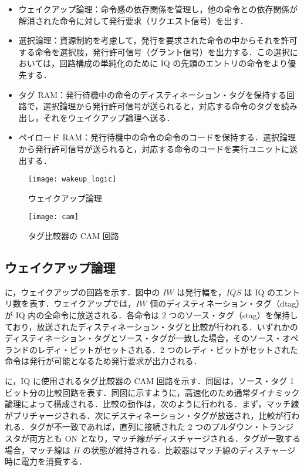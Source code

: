 \begin{itemize}
  \item ウェイクアップ論理：命令感の依存関係を管理し，他の命令との依存関係が解消された命令に対して発行要求（リクエスト信号）を出す．
  \item 選択論理：資源制約を考慮して，発行を要求された命令の中からそれを許可する命令を選択肢，発行許可信号（グラント信号）を出力する．この選択においては，回路構成の単純化のために IQ の先頭のエントリの命令をより優先する．
  \item タグ RAM：発行待機中の命令のディスティネーション・タグを保持する回路で，選択論理から発行許可信号が送られると，対応する命令のタグを読み出し，それをウェイクアップ論理へ送る．
  \item ペイロード RAM：発行待機中の命令の命令のコードを保持する．選択論理から発行許可信号が送られると，対応する命令のコードを実行ユニットに送出する． 
\end{itemize}

\begin{figure}[thb]
  \centering
  \texttt{[image: wakeup\_logic]}
  \caption{ウェイクアップ論理}
  \label{fig:wakeup_logic}
\end{figure}

\begin{figure}[htb]
  \texttt{[image: cam]}
  \caption{タグ比較器の CAM 回路}
  \label{fig:cam}
\end{figure}

\subsection{ウェイクアップ論理}
\label{sec:wakeup_logic}
に，ウェイクアップの回路を示す．図中の $IW$ は発行幅を，$IQS$ は IQ のエントリ数を表す．ウェイクアップでは，$IW$ 個のディスティネーション・タグ（dtag）が IQ 内の全命令に放送される．各命令は 2 つのソース・タグ（stag）を保持しており，放送されたディスティネーション・タグと比較が行われる．いずれかのディスティネーション・タグとソース・タグが一致した場合，そのソース・オペランドのレディ・ビットがセットされる．2 つのレディ・ビットがセットされた命令は発行が可能となるため発行要求が出力される．

に，IQ に使用されるタグ比較器の CAM 回路を示す．同図は，ソース・タグ 1 ビット分の比較回路を表す．同図に示すように，高速化のため通常ダイナミック論理によって構成される．比較の動作は，次のように行われる．まず，マッチ線がプリチャージされる．次にデスティネーション・タグが放送され，比較が行われる．タグが不一致であれば，直列に接続された 2 つのプルダウン・トランジスタが両方とも ON となり，マッチ線がディスチャージされる．タグが一致する場合，マッチ線は $H$ の状態が維持される．比較器はマッチ線のディスチャージ時に電力を消費する．

